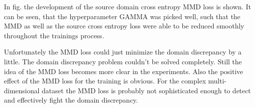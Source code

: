 In fig. the development of the source domain cross entropy MMD loss is shown. It can be seen, that the hyperparameter GAMMA was picked well, such that the MMD as well as the source cross entropy loss were able to be reduced smoothly throughout the trainings process. 


Unfortunately the MMD loss could just minimize the domain discrepancy by a little. The domain discrepancy problem couldn't be solved completely. Still the idea of the MMD loss becomes more clear in the experiments. Also the positive effect of the MMD loss for the training is obvious. For the complex multi-dimensional dataset the MMD loss is probably not sophisticated enough to detect and effectively fight the domain discrepancy.
